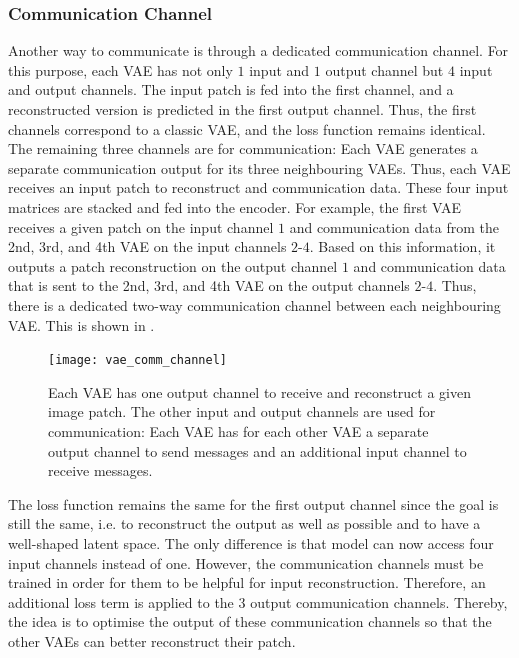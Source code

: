 \subsubsection{Communication Channel}
Another way to communicate is through a dedicated communication channel. For this purpose, each VAE has not only $1$ input and $1$ output channel but $4$ input and output channels. The input patch is fed into the first channel, and a reconstructed version is predicted in the first output channel. Thus, the first channels correspond to a classic VAE, and the loss function remains identical.
The remaining three channels are for communication: Each VAE generates a separate communication output for its three neighbouring VAEs. Thus, each VAE receives an input patch to reconstruct and communication data. These four input matrices are stacked and fed into the encoder. For example, the first VAE receives a given patch on the input channel $1$ and communication data from the 2nd, 3rd, and 4th VAE on the input channels $2$-$4$. Based on this information, it outputs a patch reconstruction on the output channel $1$ and communication data that is sent to the 2nd, 3rd, and 4th VAE on the output channels $2$-$4$. Thus, there is a dedicated two-way communication channel between each neighbouring VAE. This is shown in .

\begin{figure}[h]
    \centering
    \texttt{[image: vae\_comm\_channel]}
    \caption[Communication between VAEs with a dedicated communication channel]{Each VAE has one output channel to receive and reconstruct a given image patch. The other input and output channels are used for communication: Each VAE has for each other VAE a separate output channel to send messages and an additional input channel to receive messages.}
\end{figure}

The loss function remains the same for the first output channel since the goal is still the same, i.e. to reconstruct the output as well as possible and to have a well-shaped latent space. The only difference is that model can now access four input channels instead of one. However, the communication channels must be trained in order for them to be helpful for input reconstruction. Therefore, an additional loss term is applied to the $3$ output communication channels. Thereby, the idea is to optimise the output of these communication channels so that the other VAEs can better reconstruct their patch.

